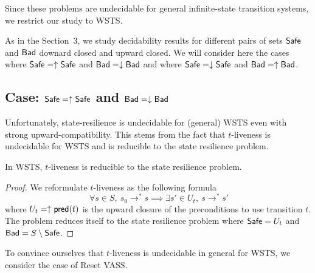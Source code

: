 


Since these problems are undecidable for general infinite-state transition systems, we restrict our study to WSTS.

As in the Section~3, we study decidability results for different pairs of sets $\textsf{Safe}$ and $\textsf{Bad}$ downard closed and upward closed. We will consider here the cases where 
$\textsf{Safe} = \uparrow \textsf{Safe}$ and $\textsf{Bad} = \downarrow \textsf{Bad}$ 
and where 
$\textsf{Safe} = \downarrow \textsf{Safe}$ and $\textsf{Bad} = \uparrow \textsf{Bad}$.


\subsection{Case: $\textsf{Safe} = \uparrow \textsf{Safe}$ and $\textsf{Bad} = \downarrow \textsf{Bad}$}




Unfortunately, state-resilience is undecidable for (general) WSTS even with strong upward-compatibility.
This stems from the fact that $t$-liveness is undecidable for WSTS and 
is reducible to the state resilience problem.

\begin{proposition}\label{reductions}
In WSTS, $t$-liveness is reducible to the state resilience problem.
\end{proposition}


\begin{proof}
We reformulate $t$-liveness as the following formula
$$ ~ \forall s \in S, ~ s_0 \rightarrow^* s \implies \exists s' \in U_t, ~ s \rightarrow^{*} s'$$  
where
$U_t=\uparrow \textsf{pred}(t)$
is the upward closure of the preconditions to use transition $t$.  
The problem reduces itself to the state resilience problem
where $\textsf{Safe} = U_t$ and $\textsf{Bad} = S \setminus \textsf{Safe}$.

\end{proof}

To convince ourselves that $t$-liveness is undecidable in general for WSTS, we consider the case of Reset VASS.


